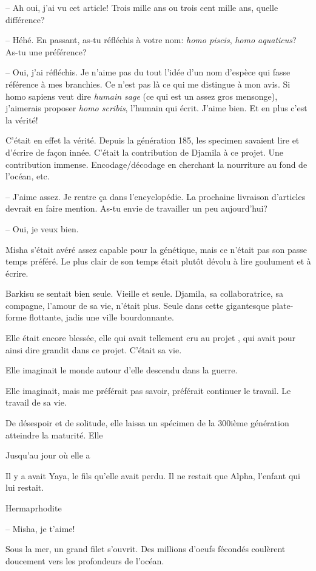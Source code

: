 -- Ah oui, j'ai vu cet article! Trois mille ans ou trois cent mille ans, quelle différence?

-- Héhé. En passant, as-tu réfléchis à votre nom: \textit{homo piscis}, \textit{homo aquaticus}? As-tu une préférence?

-- Oui, j'ai réfléchis. Je n'aime pas du tout l'idée d'un nom d'espèce qui fasse référence à mes branchies. Ce n'est pas là ce qui me distingue à mon avis. 
   Si homo sapiens veut dire \textit{humain sage} (ce qui est un assez gros mensonge), j'aimerais
   proposer \textit{homo scribis}, l'humain qui écrit. J'aime bien. Et en plus c'est la vérité!

C'était en effet la vérité. Depuis la génération 185, les specimen savaient lire et d'écrire de façon innée. C'était
la contribution de Djamila à ce projet. Une contribution immense. Encodage/décodage en cherchant la nourriture au fond de l'océan, etc.

-- J'aime assez. Je rentre ça dans l'encyclopédie. La prochaine livraison d'articles devrait en faire mention. As-tu envie de travailler un peu aujourd'hui?

-- Oui, je veux bien.

Misha s'était avéré assez capable pour la génétique, mais ce n'était pas son passe temps préféré.
Le plus clair de son temps était plutôt dévolu à lire goulument et à écrire.



Barkisu se sentait bien seule. Vieille et seule.
Djamila, sa collaboratrice, sa compagne, l'amour de sa vie, n'était plus.
Seule dans cette gigantesque plate-forme flottante, jadis une ville bourdonnante.

Elle était encore blessée, elle qui avait tellement cru au projet \nomProjet{},
qui avait pour ainsi dire grandit dans ce projet. C'était sa vie.

Elle imaginait le monde autour d'elle descendu dans la guerre.

Elle imaginait, mais me préférait pas savoir, préférait continuer le travail.
Le travail de sa vie. 

De désespoir et de solitude, elle laissa un spécimen de la 300ième génération atteindre la maturité.
Elle 

Jusqu'au jour où elle a 

Il y a avait Yaya, le fils qu'elle avait perdu.
Il ne restait que Alpha, l'enfant qui lui restait.

\sautSection{}

Hermaprhodite

\sautSection{}

-- Misha, je t'aime!

Sous la mer, un grand filet s'ouvrit. Des millions d'oeufs fécondés coulèrent
doucement vers les profondeurs de l'océan.


